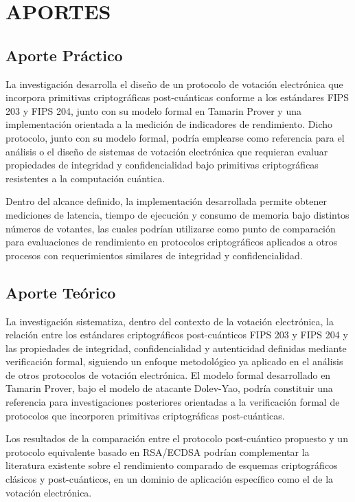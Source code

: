 \section{APORTES}

\subsection{Aporte Práctico}

La investigación desarrolla el diseño de un protocolo de votación electrónica que incorpora primitivas criptográficas post-cuánticas conforme a los estándares FIPS 203 y FIPS 204, junto con su modelo formal en Tamarin Prover y una implementación orientada a la medición de indicadores de rendimiento. Dicho protocolo, junto con su modelo formal, podría emplearse como referencia para el análisis o el diseño de sistemas de votación electrónica que requieran evaluar propiedades de integridad y confidencialidad bajo primitivas criptográficas resistentes a la computación cuántica.

Dentro del alcance definido, la implementación desarrollada permite obtener mediciones de latencia, tiempo de ejecución y consumo de memoria bajo distintos números de votantes, las cuales podrían utilizarse como punto de comparación para evaluaciones de rendimiento en protocolos criptográficos aplicados a otros procesos con requerimientos similares de integridad y confidencialidad.

\subsection{Aporte Teórico}

La investigación sistematiza, dentro del contexto de la votación electrónica, la relación entre los estándares criptográficos post-cuánticos FIPS 203 y FIPS 204 y las propiedades de integridad, confidencialidad y autenticidad definidas mediante verificación formal, siguiendo un enfoque metodológico ya aplicado en el análisis de otros protocolos de votación electrónica. El modelo formal desarrollado en Tamarin Prover, bajo el modelo de atacante Dolev-Yao, podría constituir una referencia para investigaciones posteriores orientadas a la verificación formal de protocolos que incorporen primitivas criptográficas post-cuánticas.

Los resultados de la comparación entre el protocolo post-cuántico propuesto y un protocolo equivalente basado en RSA/ECDSA podrían complementar la literatura existente sobre el rendimiento comparado de esquemas criptográficos clásicos y post-cuánticos, en un dominio de aplicación específico como el de la votación electrónica.

